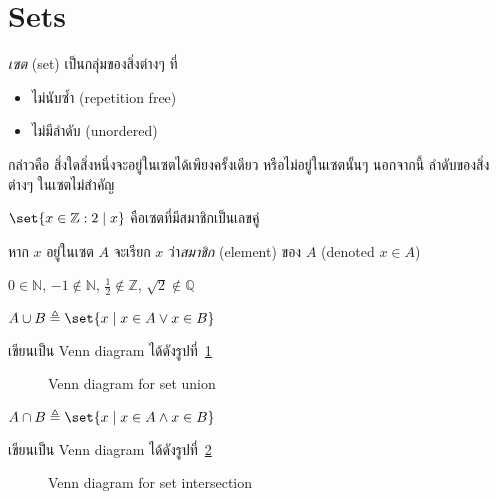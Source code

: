 \section{Sets}

\emph{เซต} (set) เป็นกลุ่มของสิ่งต่างๆ ที่
\begin{itemize}
\item ไม่นับซ้ำ (repetition free)
\item ไม่มีลำดับ (unordered)
\end{itemize}
กล่าวคือ สิ่งใดสิ่งหนึ่งจะอยู่ในเซตได้เพียงครั้งเดียว หรือไม่อยู่ในเซตนั้นๆ \enskip นอกจากนี้ ลำดับของสิ่งต่างๆ ในเซตไม่สำคัญ
%
\begin{example}
$\set{x\in\mathbb{Z}: 2\mid x}$ คือเซตที่มีสมาชิกเป็นเลขคู่
\end{example}

\begin{definition}
หาก $x$ อยู่ในเซต $A$ จะเรียก $x$ ว่า\emph{สมาชิก} (element) ของ $A$ (denoted $x\in A$)
\end{definition}
%
\begin{example}
$0\in\mathbb{N}$, $-1\notin\mathbb{N}$, $\frac{1}{2}\notin\mathbb{Z}$, $\sqrt{2}\notin\mathbb{Q}$
\end{example}

\begin{definition}
$A\cup B\triangleq\set{x\mid x\in A\vee x\in B}$
\end{definition}
เขียนเป็น Venn diagram ได้ดังรูปที่~\ref{fig:union}
%
\begin{figure}
\centering
{}
\caption{Venn diagram for set union}
\label{fig:union}
\end{figure}

\begin{definition}
$A\cap B\triangleq\set{x\mid x\in A\wedge x\in B}$
\end{definition}
เขียนเป็น Venn diagram ได้ดังรูปที่~\ref{fig:intersection}
%
\begin{figure}
\centering
{}
\caption{Venn diagram for set intersection}
\label{fig:intersection}
\end{figure}

